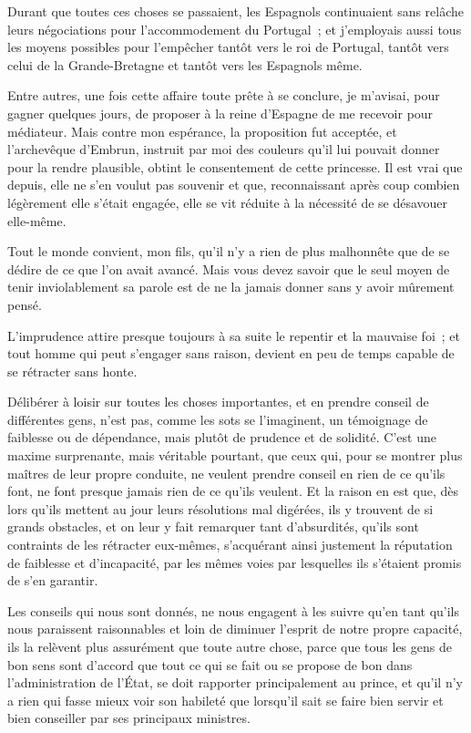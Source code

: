 \documentclass[french,twoside]{book} %
\begin{document}
Durant que toutes ces choses se passaient, les Espagnols continuaient sans relâche leurs négociations pour l’accommodement du Portugal ; et j’employais aussi tous les moyens possibles pour l’empêcher tantôt vers le roi de Portugal, tantôt vers celui de la Grande-Bretagne et tantôt vers les Espagnols même.\par
Entre autres, une fois cette affaire toute prête à se conclure, je m’avisai, pour gagner quelques jours, de proposer à la reine d’Espagne de me recevoir pour médiateur. Mais contre mon espérance, la proposition fut acceptée, et l’archevêque d’Embrun, instruit par moi des couleurs qu’il lui pouvait donner pour la rendre plausible, obtint le consentement de cette princesse. Il est vrai que depuis, elle ne s’en voulut pas souvenir et que, reconnaissant après coup combien légèrement elle s’était engagée, elle se vit réduite à la nécessité de se désavouer elle-même.\par
Tout le monde convient, mon fils, qu’il n’y a rien de plus malhonnête que de se dédire de ce que l’on avait avancé. Mais vous devez savoir que le seul moyen de tenir inviolablement sa parole est de ne la jamais donner sans y avoir mûrement pensé.\par
L’imprudence attire presque toujours à sa suite le repentir et la mauvaise foi ; et tout homme qui peut s’engager sans raison, devient en peu de temps capable de se rétracter sans honte.\par
Délibérer à loisir sur toutes les choses importantes, et en prendre conseil de différentes gens, n’est pas, comme les sots se l’imaginent, un témoignage de faiblesse ou de dépendance, mais plutôt de prudence et de solidité. C’est une maxime surprenante, mais véritable pourtant, que ceux qui, pour se montrer plus maîtres de leur propre conduite, ne veulent prendre conseil en rien de ce qu’ils font, ne font presque jamais rien de ce qu’ils veulent. Et la raison en est que, dès lors qu’ils mettent au jour leurs résolutions mal digérées, ils y trouvent de si grands obstacles, et on leur y fait remarquer tant d’absurdités, qu’ils sont contraints de les rétracter eux-mêmes, s’acquérant ainsi justement la réputation de faiblesse et d’incapacité, par les mêmes voies par lesquelles ils s’étaient promis de s’en garantir.\par
Les conseils qui nous sont donnés, ne nous engagent à les suivre qu’en tant qu’ils nous paraissent raisonnables et loin de diminuer l’esprit de notre propre capacité, ils la relèvent plus assurément que toute autre chose, parce que tous les gens de bon sens sont d’accord que tout ce qui se fait ou se propose de bon dans l’administration de l’État, se doit rapporter principalement au prince, et qu’il n’y a rien qui fasse mieux voir son habileté que lorsqu’il sait se faire bien servir et bien conseiller par ses principaux ministres.\par
\end{document}
